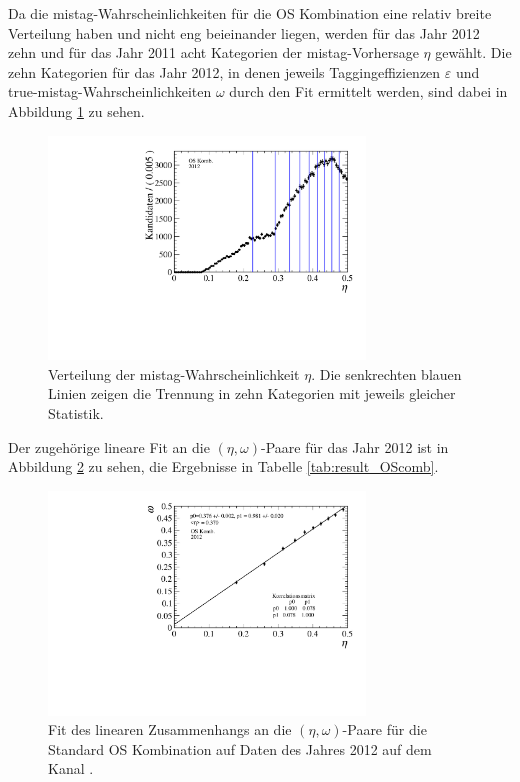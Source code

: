 Da die mistag-Wahrscheinlichkeiten für die OS Kombination eine relativ breite Verteilung haben und nicht eng beieinander liegen, werden für das Jahr \num{2012} zehn und für das Jahr \num{2011} acht Kategorien der mistag-Vorhersage $\eta$ gewählt. Die zehn Kategorien für das Jahr \num{2012}, in denen jeweils Taggingeffizienzen $\varepsilon$ und true-mistag-Wahrscheinlichkeiten $\omega$ durch den Fit ermittelt werden, sind dabei in Abbildung \ref{fig:eta_trennung} zu sehen. 
\begin{figure}[htbp]
	\centering
		\includegraphics[width=0.75\textwidth]{fig/eta_trennung.pdf}
	\caption{Verteilung der mistag-Wahrscheinlichkeit $\eta$. Die senkrechten blauen Linien zeigen die Trennung in zehn Kategorien mit jeweils gleicher Statistik.}
	\label{fig:eta_trennung} 
\end{figure}
Der zugehörige lineare Fit an die $(\eta,\omega)$-Paare für das Jahr \num{2012} ist in Abbildung \ref{fig:2012_OScomb} zu sehen, die Ergebnisse in Tabelle \ref{tab:result_OScomb}.
\begin{figure}[htbp]
	\centering
		\includegraphics[width=0.75\textwidth]{fig/2012_OScomb.pdf}
	\caption{Fit des linearen Zusammenhangs an die $(\eta,\omega)$-Paare für die Standard OS Kombination auf Daten des Jahres \num{2012} auf dem Kanal \BdToDpi.}
	\label{fig:2012_OScomb} 
\end{figure}
